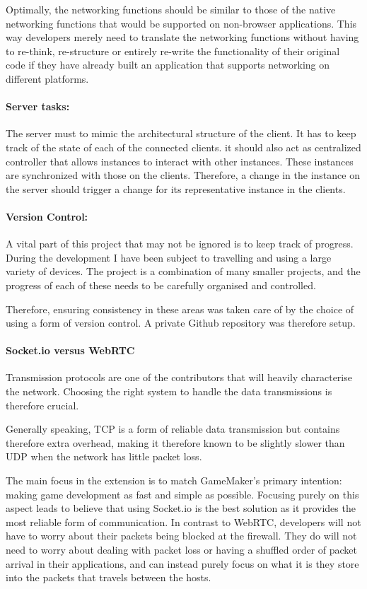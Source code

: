 \documentclass[bsc,frontabs,twoside,singlespacing,parskip,deptreport]{infthesis}     %
\begin{document}
Optimally, the networking functions should be similar to those of the native networking functions that would be supported on non-browser applications. This way developers merely need to translate the networking functions without having to re-think, re-structure or entirely  re-write the functionality of their original code if they have already built an application that supports networking on different platforms.


\paragraph*{Server tasks:}
The server must to mimic the architectural structure of the client. It has to keep track of the state of each of the connected clients. it should also act as centralized controller that allows instances to interact with other instances. These instances are synchronized with those on the clients. Therefore, a change in the instance on the server should trigger a change for its representative instance in the clients.

\paragraph*{Version Control:}
A vital part of this project that may not be ignored is to keep track of progress. During the development I have been subject to travelling and using a large variety of devices. The project is a combination of many smaller projects, and the progress of each of these needs to be carefully organised and controlled.

Therefore, ensuring consistency in these areas was taken care of by the choice of using a form of version control. A private Github \cite{github} repository was therefore setup.

\paragraph*{Socket.io versus WebRTC}
Transmission protocols are one of the contributors that will heavily characterise the network. Choosing the right system to handle the data transmissions is therefore crucial. 
 
Generally speaking, TCP is a form of reliable data transmission but contains therefore extra overhead, making it therefore known to be slightly slower than UDP when the network has little packet loss.

The main focus in the extension is to match GameMaker's primary intention: making game development as fast and simple as possible. Focusing purely on this aspect leads to believe that using Socket.io is the best solution as it provides the most reliable form of communication. In contrast to WebRTC, developers will not have to worry about their packets being blocked at the firewall. They do will not need to worry about dealing with packet loss or having a shuffled order of packet arrival in their applications, and can instead purely focus on what it is they store into the packets that travels between the hosts.
\end{document}
